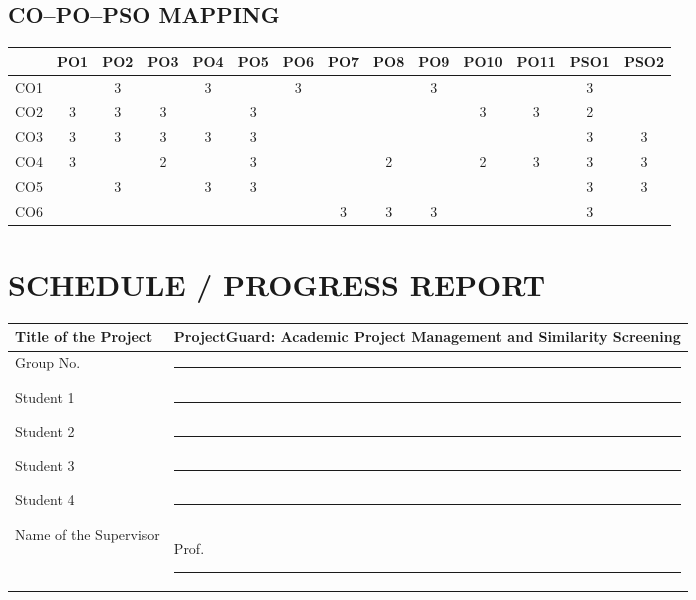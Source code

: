 \documentclass[12pt,a4paper]{article}
\newcommand{\ProjectTitle}{ProjectGuard: Academic Project Management and Similarity Screening}
\newcommand{\SupervisorName}{\rule{6cm}{0.4pt}}
\newcommand{\MemberOne}{\rule{6cm}{0.4pt}}
\newcommand{\MemberTwo}{\rule{6cm}{0.4pt}}
\newcommand{\MemberThree}{\rule{6cm}{0.4pt}}
\newcommand{\MemberFour}{\rule{6cm}{0.4pt}}
\begin{document}
\begin{landscape}
\section*{CO--PO--PSO MAPPING}
\begin{center}
\small
\renewcommand{\arraystretch}{1.9}
\setlength{\tabcolsep}{7pt}
\begin{tabular}{|l|*{11}{c|}*{2}{c|}}
\hline
 & PO1 & PO2 & PO3 & PO4 & PO5 & PO6 & PO7 & PO8 & PO9 & PO10 & PO11 & PSO1 & PSO2\\\hline
CO1 & & 3 & & 3 & & 3 & & & 3 & & & 3 &\\\hline
CO2 & 3 & 3 & 3 & & 3 & & & & & 3 & 3 & 2 &\\\hline
CO3 & 3 & 3 & 3 & 3 & 3 & & & & & & & 3 & 3\\\hline
CO4 & 3 & & 2 & & 3 & & & 2 & & 2 & 3 & 3 & 3\\\hline
CO5 & & 3 & & 3 & 3 & & & & & & & 3 & 3\\\hline
CO6 & & & & & & & 3 & 3 & 3 & & & 3 &\\\hline
\end{tabular}
\end{center}
\end{landscape}

\section*{SCHEDULE / PROGRESS REPORT}
\begin{tabularx}{\textwidth}{|p{}|X|}
\hline
Title of the Project & \ProjectTitle\\\hline
Group No. & \rule{4cm}{0.4pt}\\\hline
Student 1 & \MemberOne\\\hline
Student 2 & \MemberTwo\\\hline
Student 3 & \MemberThree\\\hline
Student 4 & \MemberFour\\\hline
Name of the Supervisor & Prof. \SupervisorName\\\hline
\end{tabularx}
\clearpage
\end{document}
